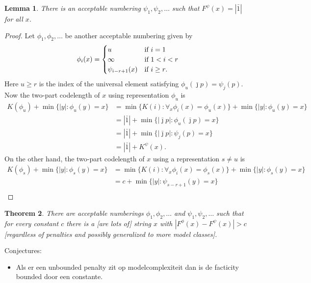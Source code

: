 \documentclass{article}
\newtheorem{theorem}{Theorem}
\newtheorem{lemma}[theorem]{Lemma}
\newcommand{\tn}[1]{\textnormal{#1}}
\begin{document}
\begin{lemma}
There is an acceptable numbering $\psi_1,\psi_2,\ldots$ such that $F^\psi(x)=|\bar 1|$ for all $x$.
\end{lemma}
\begin{proof}
Let $\phi_1,\phi_2,\ldots$ be another acceptable numbering given by
\[
\phi_i(x)=\begin{cases}
u&\tn{if $i=1$}\\
\infty&\tn{if $1<i<r$}\\
\psi_{i-r+1}(x)&\tn{if $i\ge r$}.
\end{cases}\]
Here $u\ge r$ is the index of the universal element satisfying $\phi_u(\bar\jmath p)=\psi_j(p)$.
Now the two-part codelength of $x$ using representation $\phi_u$ is
\[\begin{split}
K(\phi_u)+\min\{|y|:\phi_u(y)=x\}&=\min\{K(i):\forall_x\phi_i(x)=\phi_u(x)\}+\min\{|y|:\phi_u(y)=x\}\\
&=|\bar 1|+\min\{|\bar\jmath p|:\phi_u(\bar\jmath p)=x\}\\
&=|\bar 1|+\min\{|\bar\jmath p|:\psi_j(p)=x\}\\
&=|\bar 1|+K^\psi(x).
\end{split}\]
On the other hand, the two-part codelength of $x$ using a representation $s\ne u$ is
\[\begin{split}
K(\phi_s)+\min\{|y|:\phi_s(y)=x\}&=\min\{K(i):\forall_x\phi_i(x)=\phi_s(x)\}+\min\{|y|:\phi_s(y)=x\}\\
&=c+\min\{|y|:\psi_{s-r+1}(y)=x\}\\
\end{split}\]




\end{proof}


\begin{theorem}
  There are acceptable numberings $\phi_1,\phi_2,\ldots$ and $\psi_1,\psi_2,\ldots$ such that for every constant $c$ there is a [are lots of] string $x$ with $|F^\phi(x)-F^\psi(x)|>c$ [regardless of penalties and possibly generalized to more model classes].
\end{theorem}

Conjectures:
\begin{itemize}
\item Als er een unbounded penalty zit op modelcomplexiteit dan is de facticity bounded door een constante.
\end{itemize}

\end{document}
